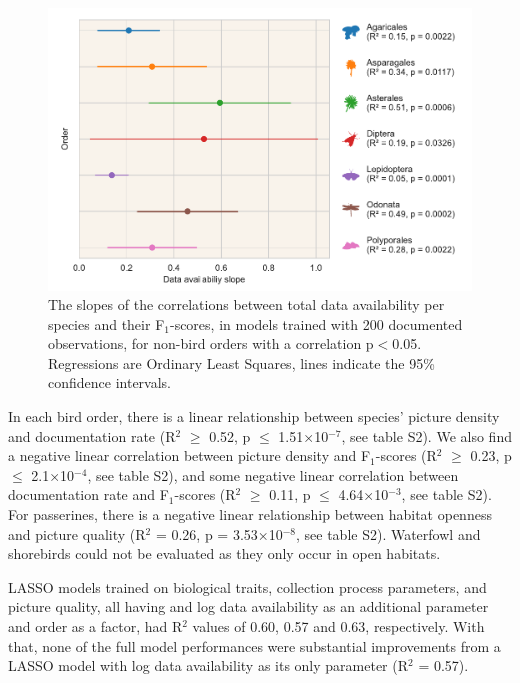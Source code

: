 \documentclass{article}
\begin{document}
\begin{figure}[!ht]
  \includegraphics[width=\textwidth]{2}
  \caption{\footnotesize The slopes of the correlations between total data availability per species and their F$_1$-scores, in models trained with 200 documented observations, for non-bird orders with a correlation p$<$0.05. Regressions are Ordinary Least Squares, lines indicate the 95\% confidence intervals.}
  \label{fig:slopes}
\end{figure}

In each bird order, there is a linear relationship between species' picture density and documentation rate (R$^2$ $\geq$ 0.52, p $\leq$ 1.51×10$^{-7}$, see table S2). We also find a negative linear correlation between picture density and F$_1$-scores (R$^2$ $\geq$ 0.23, p $\leq$ 2.1×10$^{-4}$, see table S2), and some negative linear correlation between documentation rate and F$_1$-scores (R$^2$ $\geq$ 0.11, p $\leq$ 4.64×10$^{-3}$, see table S2). For passerines, there is a negative linear relationship between habitat openness and picture quality (R$^2$ = 0.26, p = 3.53×10$^{-8}$, see table S2). Waterfowl and shorebirds could not be evaluated as they only occur in open habitats.

LASSO models trained on biological traits, collection process parameters, and picture quality, all having and log data availability as an additional parameter and order as a factor, had R$^2$ values of 0.60, 0.57 and 0.63, respectively. With that, none of the full model performances were substantial improvements from a LASSO model with log data availability as its only parameter (R$^2$ =  0.57).
\end{document}
